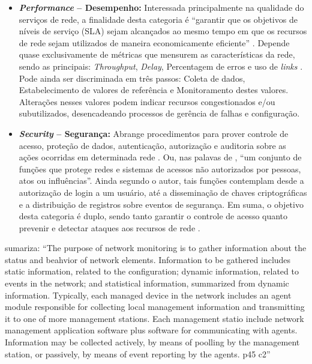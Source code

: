 \documentclass[twoside,english,brazilian]{UNISINOSmonografia}
\begin{document}
\begin{itemize}
		\item \textbf{\textit{Performance} -- Desempenho:}
Interessada principalmente na qualidade do serviços de rede, a finalidade 
desta categoria é ``garantir que os objetivos de níveis de serviço (SLA) sejam 
alcançados ao mesmo tempo em que os recursos de rede sejam utilizados de 
maneira economicamente eficiente'' \cite{Wang2012}.
Depende quase exclusivamente de métricas que mensurem as características da 
rede, sendo as principais: \textit{Throughput}, \textit{Delay}, Percentagem de 
erros e uso de \textit{links} \cite{Clemm2006,Wang2012,Ding2009,Hunt1997}.
Pode ainda ser discriminada em três passos: Coleta de dados, Estabelecimento 
de valores de referência e Monitoramento destes valores. 
Alterações nesses valores podem indicar recursos congestionados e/ou 
subutilizados, desencadeando processos de gerência de falhas e configuração.

		\item \textbf{\textit{Security} -- Segurança:}
Abrange procedimentos para prover controle de acesso, proteção de dados, 
autenticação, autorização e auditoria sobre as ações ocorridas em determinada 
rede \cite{Wang2012}.
Ou, nas palavas de , ``um conjunto de funções que protege 
redes e sistemas de acessos não autorizados por pessoas, atos ou influências''.
Ainda segundo o autor, tais funções contemplam desde a autorização de login a 
um usuário, até a disseminação de chaves criptográficas e a distribuição de 
registros sobre eventos de segurança.
Em suma, o objetivo desta categoria é duplo, sendo tanto garantir o controle 
de acesso quanto prevenir e detectar ataques aos recursos de rede 
\cite{Mauro2009}.

	\end{itemize}

 sumariza:
``The purpose of network monitoring is to gather information about the status 
and beahvior of network elements. Information to be gathered includes static 
information, related to the configuration; dynamic information, related to 
events in the network; and statistical information, summarized from dynamic 
information. Typically, each managed device in the network includes an agent 
module responsible for collecting local management information and 
transmitting it to one of more management stations. Each management statio 
include network management application software plus software for 
communicating with agents. Information may be collected actively, by means of 
poolling by the management station, or passively, by means of event reporting 
by the agents.
p45 c2''
\end{document}

